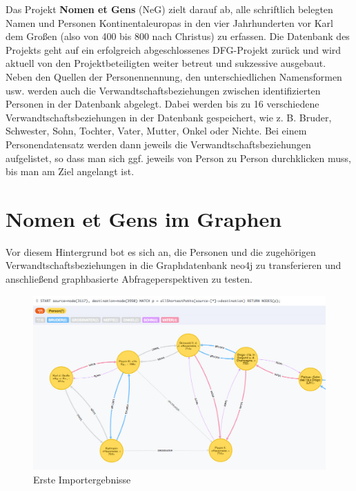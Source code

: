 \documentclass[ngerman,]{scrreprt}
\begin{document}
Das Projekt \textbf{Nomen et Gens} (NeG) zielt darauf ab, alle schriftlich belegten Namen und Personen Kontinentaleuropas in den vier Jahrhunderten vor Karl dem Großen (also von 400 bis 800 nach Christus) zu erfassen. Die Datenbank des Projekts geht auf ein erfolgreich abgeschlossenes DFG-Projekt zurück und wird aktuell von den Projektbeteiligten weiter betreut und sukzessive ausgebaut. Neben den Quellen der Personennennung, den unterschiedlichen Namensformen usw. werden auch die Verwandtschaftsbeziehungen zwischen identifizierten Personen in der Datenbank abgelegt. Dabei werden bis zu 16 verschiedene Verwandtschaftsbeziehungen in der Datenbank gespeichert, wie z. B. Bruder, Schwester, Sohn, Tochter, Vater, Mutter, Onkel oder Nichte. Bei einem Personendatensatz werden dann jeweils die Verwandtschaftsbeziehungen aufgelistet, so dass man sich ggf. jeweils von Person zu Person durchklicken muss, bis man am Ziel angelangt ist.

\section{Nomen et Gens im Graphen}\label{nomen-et-gens-im-graphen}

Vor diesem Hintergrund bot es sich an, die Personen und die zugehörigen Verwandtschaftsbeziehungen in die Graphdatenbank neo4j zu transferieren und anschließend graphbasierte Abfrageperspektiven zu testen.

\begin{figure}
\centering
\includegraphics{Bilder/NeG/020-Verwandschaften.jpg}
\caption{Erste Importergebnisse}
\end{figure}
\end{document}
